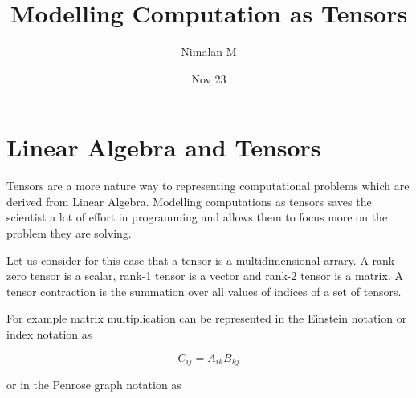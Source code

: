 \documentclass[statementpaper,oneside,article,14pt]{memoir}
\newcommand{\BackgroundPic}[1]{%
\put(0,0){%
\parbox[b][\paperheight]{\paperwidth}{%
\vfill
\centering
{\transparent{0.4} \texttt{[image: \#1]}}%
\vfill
}}}
\begin{document}

\title{Modelling Computation as Tensors}
\author{Nimalan M}
\date{Nov 23}

\begingroup
\let\cleardoublepage\clearpage


\begin{titlingpage}
\maketitle


\end{titlingpage}

\endgroup

\pagestyle{empty}




\section{Linear Algebra and Tensors}

Tensors are a more nature way to representing computational problems which are derived from Linear Algebra. Modelling computations as tensors saves the scientist a lot of effort in programming and allows them to focus more on the problem they are solving.

Let us consider for this case that a tensor is a multidimensional arrary. A rank zero tensor is a scalar, rank-1 tensor is a vector and rank-2 tensor is a matrix. A tensor contraction is the summation over all values of indices of a set of tensors.

For example matrix multiplication can be represented in the Einstein notation or index notation as

$$ C_{ij} = A_{ik} B_{kj}  $$

or in the Penrose graph notation as

\begin{center}
\end{center}
\end{document}
